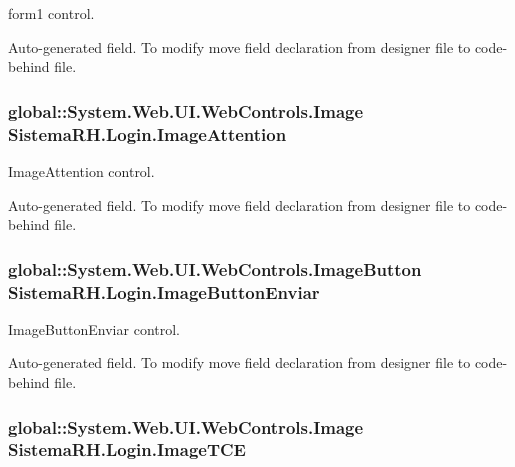 form1 control. 

Auto-\/generated field. To modify move field declaration from designer file to code-\/behind file. \hypertarget{class_sistema_r_h_1_1_login_a79e2f7ee9a557ce251e4a2f69dc3a5a8}{
\subsubsection[{ImageAttention}]{\setlength{\rightskip}{0pt plus 5cm}global::System.Web.UI.WebControls.Image {\bf SistemaRH.Login.ImageAttention}}}
\label{class_sistema_r_h_1_1_login_a79e2f7ee9a557ce251e4a2f69dc3a5a8}


ImageAttention control. 

Auto-\/generated field. To modify move field declaration from designer file to code-\/behind file. \hypertarget{class_sistema_r_h_1_1_login_afbd8f97777155a48fd950f8d1a7c2848}{
\subsubsection[{ImageButtonEnviar}]{\setlength{\rightskip}{0pt plus 5cm}global::System.Web.UI.WebControls.ImageButton {\bf SistemaRH.Login.ImageButtonEnviar}}}
\label{class_sistema_r_h_1_1_login_afbd8f97777155a48fd950f8d1a7c2848}


ImageButtonEnviar control. 

Auto-\/generated field. To modify move field declaration from designer file to code-\/behind file. \hypertarget{class_sistema_r_h_1_1_login_a3db8c619eae0b16d08f2adae437b207a}{
\subsubsection[{ImageTCE}]{\setlength{\rightskip}{0pt plus 5cm}global::System.Web.UI.WebControls.Image {\bf SistemaRH.Login.ImageTCE}}}
\label{class_sistema_r_h_1_1_login_a3db8c619eae0b16d08f2adae437b207a}


